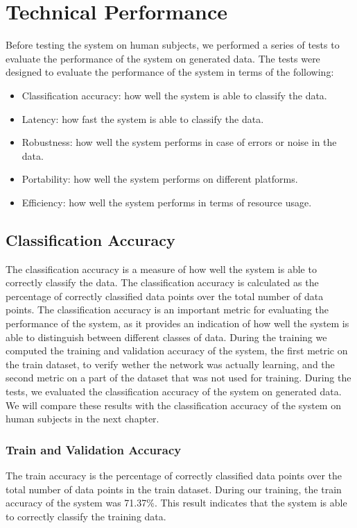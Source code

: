 \chapter{Technical Performance}\label{ch:testing}
Before testing the system on human subjects, we performed a series of tests to evaluate the performance of the system on generated data. 
The tests were designed to evaluate the performance of the system in terms of the following:
\begin{itemize}
    \item Classification accuracy: how well the system is able to classify the data.
    \item Latency: how fast the system is able to classify the data.
    \item Robustness: how well the system performs in case of errors or noise in the data.
    \item Portability: how well the system performs on different platforms.
    \item Efficiency: how well the system performs in terms of resource usage.
\end{itemize}

\section{Classification Accuracy}
The classification accuracy is a measure of how well the system is able to correctly classify the data.
The classification accuracy is calculated as the percentage of correctly classified data points over the total number of data points.
The classification accuracy is an important metric for evaluating the performance of the system, as it provides an indication of how well the system is able to distinguish between different classes of data.
During the training we computed the training and validation accuracy of the system, the first metric on the train dataset, to verify wether the network was actually learning, and the second metric on a part of the dataset that was not used for training.
During the tests, we evaluated the classification accuracy of the system on generated data.
We will compare these results with the classification accuracy of the system on human subjects in the next chapter.

\subsection*{Train and Validation Accuracy}
The train accuracy is the percentage of correctly classified data points over the total number of data points in the train dataset.
During our training, the train accuracy of the system was 71.37\%.
This result indicates that the system is able to correctly classify the training data.

